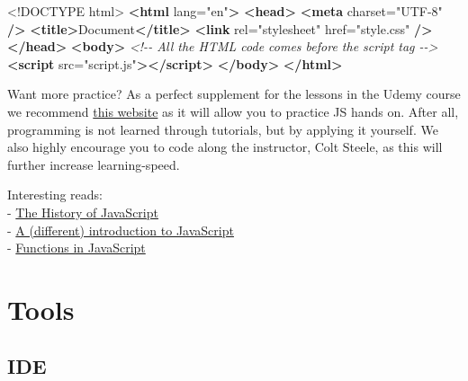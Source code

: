 \documentclass[
]{article}
\newenvironment{Shaded}{\begin{snugshade}}{\end{snugshade}}
\newcommand{\CommentTok}[1]{\textcolor[rgb]{0.56,0.35,0.01}{\textit{#1}}}
\newcommand{\DataTypeTok}[1]{\textcolor[rgb]{0.13,0.29,0.53}{#1}}
\newcommand{\KeywordTok}[1]{\textcolor[rgb]{0.13,0.29,0.53}{\textbf{#1}}}
\newcommand{\NormalTok}[1]{#1}
\newcommand{\OtherTok}[1]{\textcolor[rgb]{0.56,0.35,0.01}{#1}}
\newcommand{\StringTok}[1]{\textcolor[rgb]{0.31,0.60,0.02}{#1}}
\begin{document}
\begin{Shaded}
\begin{Highlighting}[]
\DataTypeTok{\textless{}!DOCTYPE }\NormalTok{html}\DataTypeTok{\textgreater{}}
\KeywordTok{\textless{}html}\OtherTok{ lang=}\StringTok{"en"}\KeywordTok{\textgreater{}}
  \KeywordTok{\textless{}head\textgreater{}}
    \KeywordTok{\textless{}meta}\OtherTok{ charset=}\StringTok{"UTF{-}8"} \KeywordTok{/\textgreater{}}
    \KeywordTok{\textless{}title\textgreater{}}\NormalTok{Document}\KeywordTok{\textless{}/title\textgreater{}}
    \KeywordTok{\textless{}link}\OtherTok{ rel=}\StringTok{"stylesheet"}\OtherTok{ href=}\StringTok{"style.css"} \KeywordTok{/\textgreater{}}
  \KeywordTok{\textless{}/head\textgreater{}}
  \KeywordTok{\textless{}body\textgreater{}}
    \CommentTok{\textless{}!{-}{-} All the HTML code comes before the script tag {-}{-}\textgreater{}}
    \KeywordTok{\textless{}script}\OtherTok{ src=}\StringTok{"script.js"}\KeywordTok{\textgreater{}\textless{}/script\textgreater{}}
  \KeywordTok{\textless{}/body\textgreater{}}
\KeywordTok{\textless{}/html\textgreater{}}
\end{Highlighting}
\end{Shaded}

Want more practice? As a perfect supplement for the lessons in the Udemy course we recommend \href{https://learnjavascript.online/}{this website} as it will allow you to practice JS hands on. After all, programming is not learned through tutorials, but by applying it yourself. We also highly encourage you to code along the instructor, Colt Steele, as this will further increase learning-speed.

Interesting reads:\\
- \href{https://medium.com/@_benaston/lesson-1a-the-history-of-javascript-8c1ce3bffb17}{The History of JavaScript}\\
- \href{https://javascript.info/intro}{A (different) introduction to JavaScript}\\
- \href{https://javascript.info/function-basics}{Functions in JavaScript}

\hypertarget{tools}{%
\section{Tools}\label{tools}}

\hypertarget{ide}{%
\subsection{IDE}\label{ide}}
\end{document}
